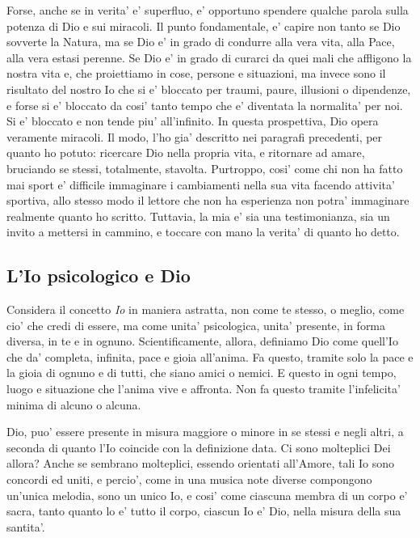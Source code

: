 Forse, anche se in verita' e' superfluo, e' opportuno spendere qualche parola sulla potenza di Dio e sui miracoli. Il punto fondamentale, e' capire non tanto se Dio sovverte la Natura, ma se Dio e' in grado di condurre alla vera vita, alla Pace, alla vera estasi perenne. Se Dio e' in grado di curarci da quei mali che affligono la nostra vita e, che proiettiamo in cose, persone e situazioni, ma invece sono il risultato del nostro Io che si e' bloccato per traumi, paure, illusioni o dipendenze, e forse si e' bloccato da cosi' tanto tempo che e' diventata la normalita' per noi. Si e' bloccato e non tende piu' all'infinito. In questa prospettiva, Dio opera veramente miracoli. Il modo, l'ho gia' descritto nei paragrafi precedenti, per quanto ho potuto: ricercare Dio nella propria vita, e ritornare ad amare, bruciando se stessi, totalmente, stavolta. Purtroppo, cosi' come chi non ha fatto mai sport e' difficile immaginare i cambiamenti nella sua vita facendo attivita' sportiva, allo stesso modo il lettore che non ha esperienza non potra' immaginare realmente quanto ho scritto. Tuttavia, la mia e' sia una testimonianza, sia un invito a mettersi in cammino, e toccare con mano la verita' di quanto ho detto.

\subsection{L'Io psicologico e Dio}

\label{DioScientificamentePoesia}
\label{DioScientificamentePsicologicamente}

Considera il concetto \emph{Io} in maniera astratta, non come te stesso, o meglio, come cio' che credi di essere, ma come unita' psicologica, unita' presente, in forma diversa, in te e in ognuno. Scientificamente, allora, definiamo Dio come quell'Io che da' completa, infinita, pace e gioia all'anima. Fa questo, tramite solo la pace e la gioia di ognuno e di tutti, che siano amici o nemici. E questo in ogni tempo, luogo e situazione che l'anima vive e affronta. Non fa questo tramite l'infelicita' minima di alcuno o alcuna. 

Dio, puo' essere presente in misura maggiore o minore in se stessi e negli altri, a seconda di quanto l'Io coincide con la definizione data. Ci sono molteplici Dei allora? Anche se sembrano molteplici, essendo orientati all'Amore, tali Io sono concordi ed uniti, e percio', come in una musica note diverse compongono un'unica melodia, sono un unico Io, e cosi' come ciascuna membra di un corpo e' sacra, tanto quanto lo e' tutto il corpo, ciascun Io e' Dio, nella misura della sua santita'.

